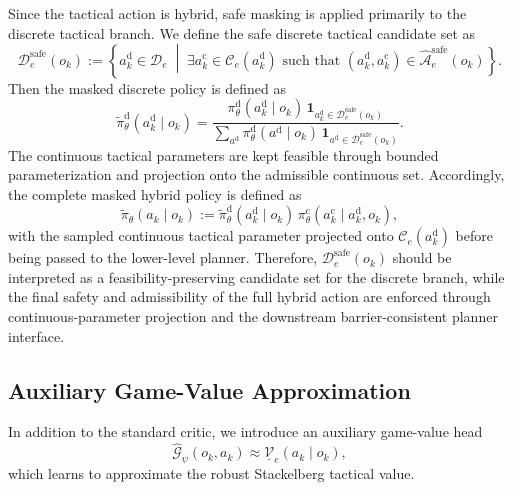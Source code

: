 \documentclass[final ,3p, times]{elsarticle}
\begin{document}
Since the tactical action is hybrid, safe masking is applied primarily to the discrete tactical branch. We define the safe discrete tactical candidate set as
\begin{equation}
\mathcal{D}_e^{\mathrm{safe}}(o_k)
:=
\left\{
a_k^{\mathrm{d}}\in\mathcal{D}_e
\;\middle|\;
\exists a_k^{\mathrm{c}}\in\mathcal{C}_e(a_k^{\mathrm{d}})
\text{ such that }
(a_k^{\mathrm{d}},a_k^{\mathrm{c}})
\in
\widehat{\mathcal{A}}_e^{\mathrm{safe}}(o_k)
\right\}.
\label{eq:safe_discrete_set}
\end{equation}
Then the masked discrete policy is defined as
\begin{equation}
\tilde \pi_\theta^{\mathrm{d}}(a_k^{\mathrm{d}}\mid o_k)
=
\frac{
\pi_\theta^{\mathrm{d}}(a_k^{\mathrm{d}}\mid o_k)\,
\mathbf{1}_{a_k^{\mathrm{d}}\in\mathcal{D}_e^{\mathrm{safe}}(o_k)}
}{
\sum_{a^{\mathrm{d}}}
\pi_\theta^{\mathrm{d}}(a^{\mathrm{d}}\mid o_k)\,
\mathbf{1}_{a^{\mathrm{d}}\in\mathcal{D}_e^{\mathrm{safe}}(o_k)}
}.
\label{eq:masked_policy}
\end{equation}
The continuous tactical parameters are kept feasible through bounded parameterization and projection onto the admissible continuous set. Accordingly, the complete masked hybrid policy is defined as
\begin{equation}
\tilde\pi_\theta(a_k\mid o_k)
:=
\tilde \pi_\theta^{\mathrm{d}}(a_k^{\mathrm{d}}\mid o_k)\,
\pi_\theta^{\mathrm{c}}(a_k^{\mathrm{c}}\mid a_k^{\mathrm{d}},o_k),
\label{eq:masked_hybrid_policy}
\end{equation}
with the sampled continuous tactical parameter projected onto $\mathcal{C}_e(a_k^{\mathrm{d}})$ before being passed to the lower-level planner.
Therefore, $\mathcal{D}_e^{\mathrm{safe}}(o_k)$ should be interpreted as a feasibility-preserving candidate set for the discrete branch, while the final safety and admissibility of the full hybrid action are enforced through continuous-parameter projection and the downstream barrier-consistent planner interface.



\subsection{Auxiliary Game-Value Approximation}
\label{subsec:auxiliary_head}

In addition to the standard critic, we introduce an auxiliary game-value head
\begin{equation}
\hat{\mathcal{G}}_\psi(o_k,a_k)
\approx
\underline{\mathcal{V}}_e(a_k\mid o_k),
\label{eq:auxiliary_head}
\end{equation}
which learns to approximate the robust Stackelberg tactical value.
\end{document}

